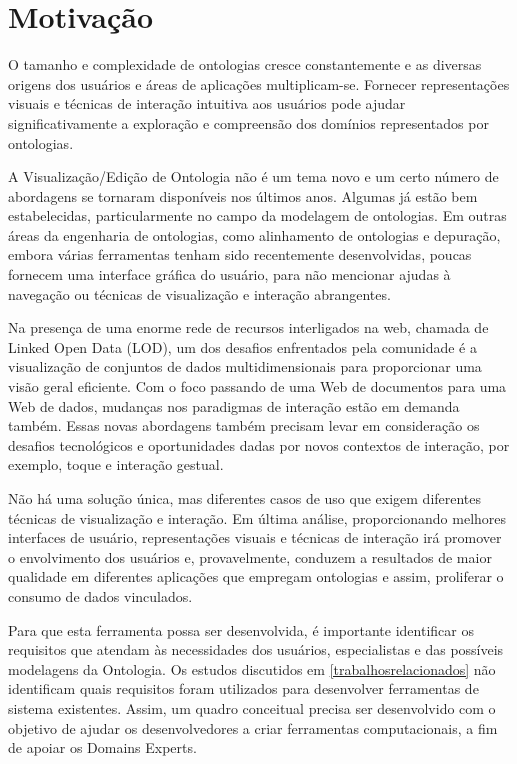 \section{Motivação}

O tamanho e complexidade de ontologias cresce constantemente e as diversas origens dos usuários e áreas de aplicações multiplicam-se. Fornecer representações visuais e técnicas de interação intuitiva aos usuários pode ajudar significativamente a exploração e compreensão dos domínios representados por ontologias.

A Visualização/Edição de Ontologia não é um tema novo e um certo número de abordagens se tornaram disponíveis nos últimos anos. Algumas já estão bem estabelecidas, particularmente no campo da modelagem de ontologias. Em outras áreas da engenharia de ontologias, como alinhamento de ontologias e depuração, embora várias ferramentas tenham sido recentemente desenvolvidas, poucas fornecem uma interface gráfica do usuário, para não mencionar ajudas à navegação ou técnicas de visualização e interação abrangentes.

Na presença de uma enorme rede de recursos interligados na web, chamada de Linked Open Data (LOD), um dos desafios enfrentados pela comunidade é a visualização de conjuntos de dados multidimensionais para proporcionar uma visão geral eficiente. Com o foco passando de uma Web de documentos para uma Web de dados, mudanças nos paradigmas de interação estão em demanda também. Essas novas abordagens também precisam levar em consideração os desafios tecnológicos e oportunidades dadas por novos contextos de interação, por exemplo, toque e interação gestual.

Não há uma solução única, mas diferentes casos de uso que exigem diferentes técnicas de visualização e interação. Em última análise, proporcionando melhores interfaces de usuário, representações visuais e técnicas de interação irá promover o envolvimento dos usuários e, provavelmente, conduzem a resultados de maior qualidade em diferentes aplicações que empregam ontologias e assim, proliferar o consumo de dados vinculados.

Para que esta ferramenta possa ser desenvolvida, é importante identificar os requisitos que atendam às necessidades dos usuários, especialistas e das possíveis modelagens da Ontologia. Os estudos discutidos em \autoref {trabalhosrelacionados} não identificam quais requisitos foram utilizados para desenvolver ferramentas de sistema existentes. Assim, um quadro conceitual precisa ser desenvolvido com o objetivo de ajudar os desenvolvedores a criar ferramentas computacionais, a fim de apoiar os Domains Experts.

